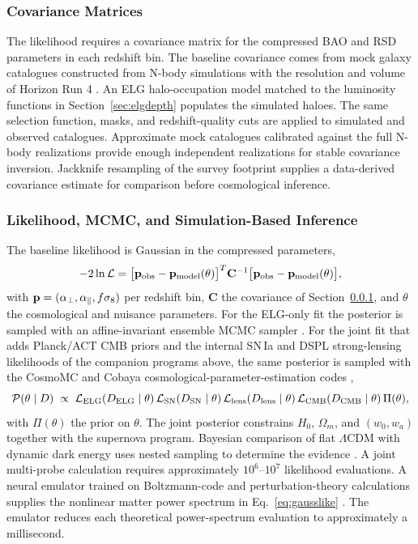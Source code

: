 \subsubsection{Covariance Matrices}\label{sec:covariance}

The likelihood requires a covariance matrix for the compressed BAO and RSD parameters in each redshift bin. The baseline covariance comes from mock galaxy catalogues constructed from N-body simulations with the resolution and volume of Horizon Run 4 \cite{hr4}. An ELG halo-occupation model matched to the luminosity functions in Section~\ref{sec:elgdepth} populates the simulated haloes. The same selection function, masks, and redshift-quality cuts are applied to simulated and observed catalogues. Approximate mock catalogues calibrated against the full N-body realizations provide enough independent realizations for stable covariance inversion. Jackknife resampling of the survey footprint supplies a data-derived covariance estimate for comparison before cosmological inference.

\subsubsection{Likelihood, MCMC, and Simulation-Based Inference}

The baseline likelihood is Gaussian in the compressed parameters,
\begin{equation}
  -2\ln\mathcal{L} =
  \big[\mathbf{p}_{\rm obs}-\mathbf{p}_{\rm model}(\theta)\big]^{T}
  \mathbf{C}^{-1}
  \big[\mathbf{p}_{\rm obs}-\mathbf{p}_{\rm model}(\theta)\big],
  \label{eq:gausslike}
\end{equation}
with $\mathbf{p}=(\alpha_\perp,\alpha_\parallel,f\sigma_8)$ per redshift bin, $\mathbf{C}$ the covariance of Section~\ref{sec:covariance}, and $\theta$ the cosmological and nuisance parameters. For the ELG-only fit the posterior is sampled with an affine-invariant ensemble MCMC sampler \cite{emcee2013}. For the joint fit that adds Planck/ACT CMB priors and the internal SN\,Ia and DSPL strong-lensing likelihoods of the companion programs above, the same posterior is sampled with the CosmoMC and Cobaya cosmological-parameter-estimation codes \cite{lewisbridle2002,torradolewis2021},
\begin{equation}
  \mathcal{P}(\theta\mid D) \;\propto\;
  \mathcal{L}_{\rm ELG}(D_{\rm ELG}\mid\theta)\,
  \mathcal{L}_{\rm SN}(D_{\rm SN}\mid\theta)\,
  \mathcal{L}_{\rm lens}(D_{\rm lens}\mid\theta)\,
  \mathcal{L}_{\rm CMB}(D_{\rm CMB}\mid\theta)\,
  \Pi(\theta),
  \label{eq:jointpost}
\end{equation}
with $\Pi(\theta)$ the prior on $\theta$. The joint posterior constrains $H_0$, $\Omega_m$, and $(w_0,w_a)$ together with the supernova program. Bayesian comparison of flat $\Lambda$CDM with dynamic dark energy uses nested sampling to determine the evidence \cite{polychord2015}. A joint multi-probe calculation requires approximately $10^6$--$10^7$ likelihood evaluations. A neural emulator trained on Boltzmann-code and perturbation-theory calculations supplies the nonlinear matter power spectrum in Eq.~\eqref{eq:gausslike} \cite{cosmopower2022,euclidemulator2021}. The emulator reduces each theoretical power-spectrum evaluation to approximately a millisecond.

